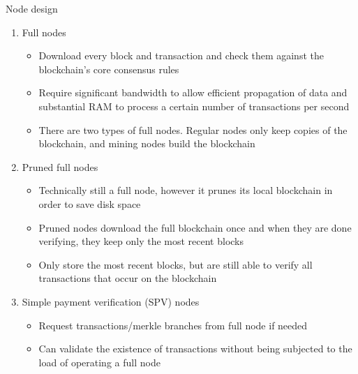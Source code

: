 \documentclass[11pt]{beamer}
\begin{document}
\begin{frame}{Node design}
	\begin{enumerate}
		\item Full nodes
			\begin{itemize}
				\item Download every block and transaction and check them against the blockchain's core consensus rules
				\item Require significant bandwidth to allow efficient propagation of data and substantial RAM to process a certain number of transactions per second
				\item There are two types of full nodes. Regular nodes only keep copies of the blockchain, and mining nodes build the blockchain
			\end{itemize}
		\item Pruned full nodes
			\begin{itemize}
				\item Technically still a full node, however it prunes its local blockchain in order to save disk space
				\item Pruned nodes download the full blockchain once and when they are done verifying, they keep only the most recent blocks
				\item Only store the most recent blocks, but are still able to verify all transactions that occur on the blockchain
			\end{itemize}
		\item Simple payment verification (SPV) nodes
			\begin{itemize}
				\item Request transactions/merkle branches from full node if needed
				\item Can validate the existence of transactions without being subjected to the load of operating a full node
			\end{itemize}
	\end{enumerate}
\end{frame}

\end{document}

